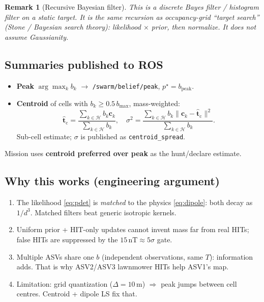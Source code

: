 \documentclass[11pt,a4paper]{article}
\newtheorem{remark}{Remark}
\begin{document}
\begin{remark}[Recursive Bayesian filter]
This is a discrete Bayes filter / histogram filter on a static target.
It is the same recursion as occupancy-grid ``target search'' (Stone / Bayesian
search theory): likelihood \(\times\) prior, then normalize. It does
\emph{not} assume Gaussianity.
\end{remark}

\subsection{Summaries published to ROS}
\begin{itemize}[leftmargin=*]
  \item \textbf{Peak} \(\arg\max_k b_k\) \(\to\) \texttt{/swarm/belief/peak},
        \(p^{\star}=b_{\mathrm{peak}}\).
  \item \textbf{Centroid} of cells with \(b_k\ge 0.5\,b_{\max}\), mass-weighted:
        \[
        \hat{\mathbf{t}}_{\mathrm{c}}
        =\frac{\sum_{k\in\mathcal{H}} b_k\mathbf{c}_k}{\sum_{k\in\mathcal{H}} b_k},
        \quad
        \sigma^{2}
        =\frac{\sum_{k\in\mathcal{H}} b_k\lVert\mathbf{c}_k-\hat{\mathbf{t}}_{\mathrm{c}}\rVert^{2}}
              {\sum_{k\in\mathcal{H}} b_k}.
        \]
        Sub-cell estimate; \(\sigma\) is published as
        \texttt{centroid\_spread}.
\end{itemize}
Mission uses \textbf{centroid preferred over peak} as the hunt/declare estimate.

\subsection{Why this works (engineering argument)}
\begin{enumerate}[leftmargin=*]
  \item The likelihood \eqref{eq:pdet} is \emph{matched} to the physics
        \eqref{eq:dipole}: both decay as \(1/d^{3}\). Matched filters beat
        generic isotropic kernels.
  \item Uniform prior + HIT-only updates cannot invent mass far from real HITs;
        false HITs are suppressed by the \(15\,\mathrm{nT}\approx5\sigma\) gate.
  \item Multiple ASVs share one \(b\) (independent observations, same \(T\)):
        information adds. That is why ASV2/ASV3 lawnmower HITs help ASV1's map.
  \item Limitation: grid quantization (\(\Delta=10\,\mathrm{m}\)) \(\Rightarrow\)
        peak jumps between cell centres. Centroid + dipole LS fix that.
\end{enumerate}
\end{document}
